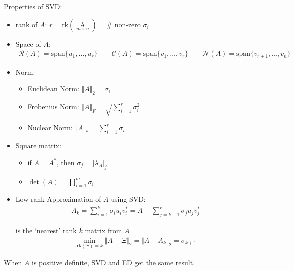 \begin{point}
    Properties of SVD:
\end{point}

   
\begin{itemize}[topsep=2pt,itemsep=0pt]
    \item rank of $ A $: $ r=\mathrm{rk}(\mathop{A}\limits_{m\times n} )=\# \text{ non-zero } \sigma _i  $
    \item Space of $ A  $:
    \begin{align}
         \mathcal{R}(A)=\mathrm{span}\{u_1,\ldots ,u_r\}\qquad \mathcal{C}(A)=\mathrm{span}\{v_1,\ldots,v_r\}\qquad \mathcal{N}(A)=\mathrm{span}\{v_{r+1},\ldots,v_n\}
    \end{align}
    \item Norm:
    \begin{itemize}[topsep=2pt,itemsep=0pt]
        \item Euclidean Norm: $ \Vert A \Vert _2=\sigma _1 $
        \item Frobenius Norm: $ \Vert A \Vert _F=\sqrt{\sum_{i=1}^r\sigma _i^2 } $
        \item Nuclear Norm: $ \Vert A \Vert _*=\sum_{i=1}^r\sigma _i $
    \end{itemize}
    \item Square matrix:
    \begin{itemize}
        \item if $ A=A^* $, then $ \sigma _j=|\lambda _A|_j $
        \item $ \det(A)=\prod_{i=1}^m\sigma _i $
    \end{itemize}
    \item Low-rank Approximation of $ A $ using SVD:
    \begin{align}
        A_k= \sum_{i=1}^k\sigma _iu_iv_i^*=A-\sum_{j=k+1}^r\sigma _ju_jv_j^*
    \end{align}
    
    is the `nearest' rank $ k $ matrix from $ A $ 
    \begin{align}
        \mathop{\min}\limits_{\mathrm{rk}(\Xi)=k }\Vert A-\Xi \Vert _2=\Vert A-A_k \Vert _2=\sigma _{k+1}  
    \end{align}
    
\end{itemize}

\begin{point}
    When $ A $ is positive definite, SVD and ED get the same result.
\end{point}

